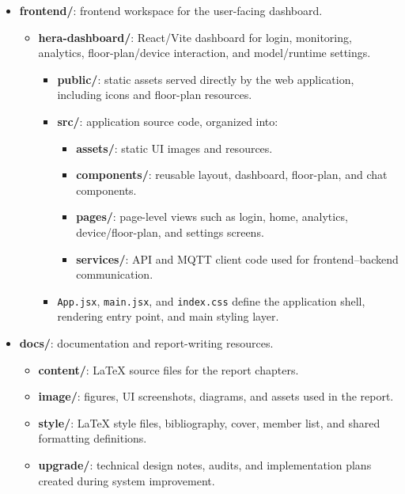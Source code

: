 \begin{itemize}
  \item \textbf{frontend/}: frontend workspace for the user-facing dashboard.
    \begin{itemize}
      \item \textbf{hera-dashboard/}: React/Vite dashboard for login, monitoring, analytics, floor-plan/device interaction, and model/runtime settings.
        \begin{itemize}
          \item \textbf{public/}: static assets served directly by the web application, including icons and floor-plan resources.
          \item \textbf{src/}: application source code, organized into:
            \begin{itemize}
              \item \textbf{assets/}: static UI images and resources.
              \item \textbf{components/}: reusable layout, dashboard, floor-plan, and chat components.
              \item \textbf{pages/}: page-level views such as login, home, analytics, device/floor-plan, and settings screens.
              \item \textbf{services/}: API and MQTT client code used for frontend--backend communication.
            \end{itemize}
          \item \texttt{App.jsx}, \texttt{main.jsx}, and \texttt{index.css} define the application shell, rendering entry point, and main styling layer.
        \end{itemize}
    \end{itemize}

  \item \textbf{docs/}: documentation and report-writing resources.
    \begin{itemize}
      \item \textbf{content/}: LaTeX source files for the report chapters.
      \item \textbf{image/}: figures, UI screenshots, diagrams, and assets used in the report.
      \item \textbf{style/}: LaTeX style files, bibliography, cover, member list, and shared formatting definitions.
      \item \textbf{upgrade/}: technical design notes, audits, and implementation plans created during system improvement.
    \end{itemize}


\end{itemize}
